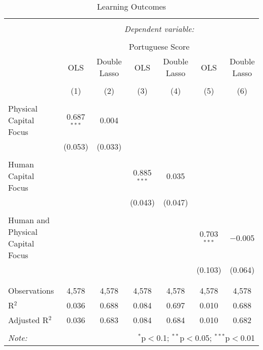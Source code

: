 
\begin{table}[!htbp] \centering 
  \caption{Learning Outcomes} 
  \label{} 
\begin{tabular}{@{\extracolsep{5pt}}lcccccc} 
\\[-1.8ex]\hline 
\hline \\[-1.8ex] 
 & \multicolumn{6}{c}{\textit{Dependent variable:}} \\ 
\cline{2-7} 
\\[-1.8ex] & \multicolumn{6}{c}{Portuguese Score} \\ 
 & OLS & Double Lasso & OLS & Double Lasso & OLS & Double Lasso \\ 
\\[-1.8ex] & (1) & (2) & (3) & (4) & (5) & (6)\\ 
\hline \\[-1.8ex] 
 Physical Capital Focus & 0.687$^{***}$ & 0.004 &  &  &  &  \\ 
  & (0.053) & (0.033) &  &  &  &  \\ 
  & & & & & & \\ 
 Human Capital Focus &  &  & 0.885$^{***}$ & 0.035 &  &  \\ 
  &  &  & (0.043) & (0.047) &  &  \\ 
  & & & & & & \\ 
 Human and Physical Capital Focus &  &  &  &  & 0.703$^{***}$ & $-$0.005 \\ 
  &  &  &  &  & (0.103) & (0.064) \\ 
  & & & & & & \\ 
\hline \\[-1.8ex] 
Observations & 4,578 & 4,578 & 4,578 & 4,578 & 4,578 & 4,578 \\ 
R$^{2}$ & 0.036 & 0.688 & 0.084 & 0.697 & 0.010 & 0.688 \\ 
Adjusted R$^{2}$ & 0.036 & 0.683 & 0.084 & 0.684 & 0.010 & 0.682 \\ 
\hline 
\hline \\[-1.8ex] 
\textit{Note:}  & \multicolumn{6}{r}{$^{*}$p$<$0.1; $^{**}$p$<$0.05; $^{***}$p$<$0.01} \\ 
\end{tabular} 
\end{table} 
